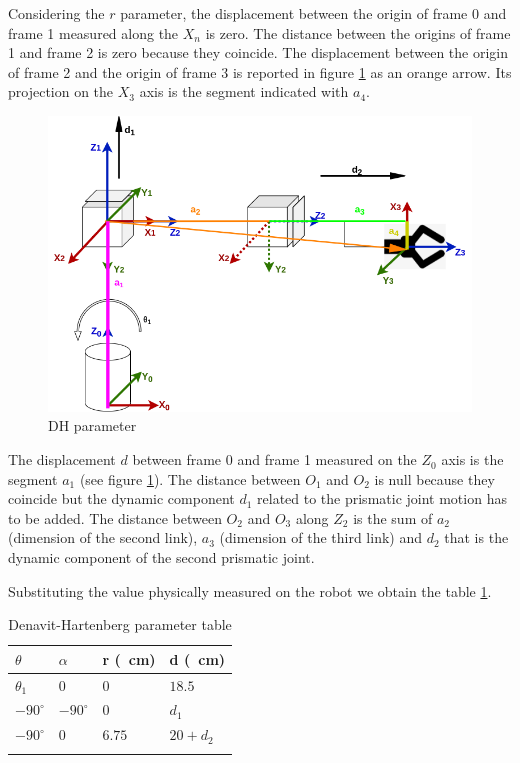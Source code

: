 Considering the $r$ parameter, the displacement between the origin of frame 0 and frame 1 measured along the $X_n$ is zero. The distance between the origins of frame 1 and frame 2 is zero because they coincide. The displacement between the origin of frame 2 and the origin of frame 3 is reported in figure \ref{fig:DHparameters} as an orange arrow. Its projection on the $X_3$ axis is the segment indicated with $a_4$.

\begin{figure}[!h]
\begin{center}
\includegraphics[width=0.7\linewidth]{capitolo3/figure/DHparameter.png}
\caption{DH parameter}
\label{fig:DHparameters}
\end{center}
\end{figure}

The displacement $d$ between frame 0 and frame 1 measured on the $Z_0$ axis is the segment $a_1$ (see figure \ref{fig:DHparameters}). The distance between $O_1$ and $O_2$ is null because they coincide but the dynamic component $d_1$ related to the prismatic joint motion has to be added. The distance between $O_2$ and $O_3$ along $Z_2$ is the sum of $a_2$ (dimension of the second link), $a_3$ (dimension of the third link) and $d_2$ that is the dynamic component of the second prismatic joint.

\newpage
Substituting the value physically measured on the robot we obtain the table \ref{table:DHtable1}.

\begin{longtable}{|p{3cm}|p{3cm}|p{3cm}|p{3cm}|}
	\hline 
	\textbf{$\theta$}&\textbf{$\alpha$}&\textbf{r (\SI{}{\centi\metre})}&\textbf{d (\SI{}{\centi\metre})}\\ 
	\hline 
	$\theta_1$&0&0&$18.5$\\ 
	\hline
    $-90^{\circ}$&$-90^{\circ}$&0&$d_1$\\
	\hline
	$-90^{\circ}$&0&$6.75$&$20+d_2$\\
	\hline
	\caption{Denavit-Hartenberg parameter table}
    \label{table:DHtable1}
\end{longtable} 

